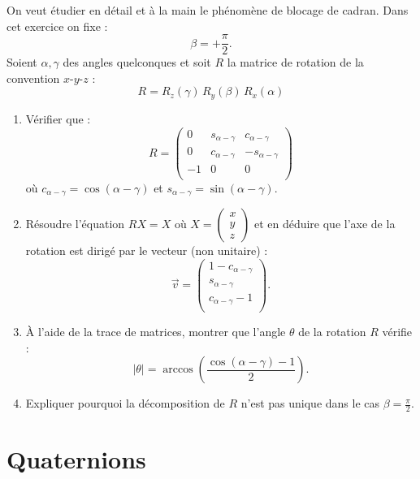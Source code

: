 \documentclass[11pt,class=report,crop=false]{standalone}
\begin{document}
\begin{exercicecours}
On veut étudier en détail et à la main le phénomène de blocage de cadran.
Dans cet exercice on fixe :
$$\beta = +\frac\pi2.$$
Soient $\alpha,\gamma$ des angles quelconques et soit $R$ la matrice de rotation de la convention $x$-$y$-$z$ :
$$R = R_z(\gamma) \, R_y(\beta) \, R_x(\alpha) $$

\begin{enumerate}
  \item Vérifier que :
$$R = \begin{pmatrix}
0 & s_{\alpha - \gamma} & c_{\alpha - \gamma} \\
0 & c_{\alpha - \gamma} & -s_{\alpha - \gamma} \\
- 1 & 0 &  0 \\  
\end{pmatrix}
$$
où $c_{\alpha - \gamma} = \cos(\alpha-\gamma)$ et $s_{\alpha - \gamma} = \sin(\alpha-\gamma)$.

  \item Résoudre l'équation $RX=X$ où $X = \left(\begin{smallmatrix}x\\y\\z\end{smallmatrix}\right)$ et en déduire que l'axe de la rotation  est dirigé par le vecteur (non unitaire) : 
$$\vec v = 
\begin{pmatrix}
1-c_{\alpha - \gamma} \\
s_{\alpha - \gamma} \\
c_{\alpha - \gamma} - 1 \\
\end{pmatrix}.$$

  \item À l'aide de la trace de matrices, montrer que l'angle $\theta$ de la rotation $R$ vérifie :
  $$|\theta| = \arccos\left( \frac{\cos(\alpha-\gamma) - 1}{2}\right).$$

  \item Expliquer pourquoi la décomposition de $R$ n'est pas unique dans le cas $\beta = \frac\pi2$.
\end{enumerate}
\end{exercicecours}



\section{Quaternions}
\end{document}
